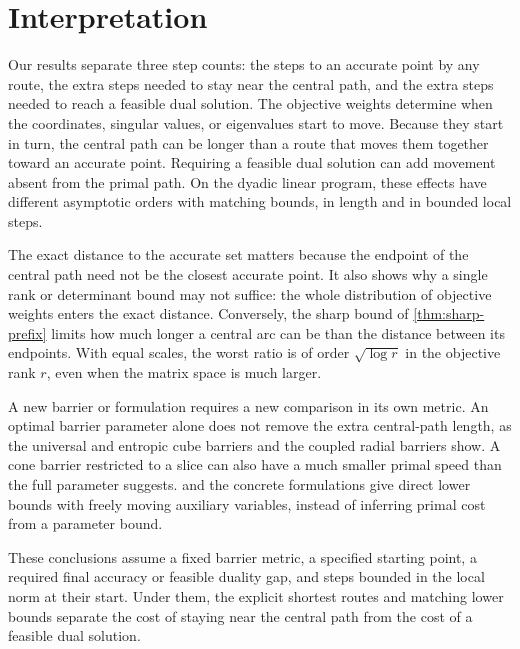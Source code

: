 \section{Interpretation}
\label{sec:interpretation}

Our results separate three step counts: the steps to an accurate point
by any route, the extra steps needed to stay near the central path,
and the extra steps needed to reach a feasible dual solution. The
objective weights determine when the coordinates, singular values, or
eigenvalues start to move. Because they start in turn, the central path
can be longer than a route that moves them together toward an accurate
point. Requiring a feasible dual solution can add movement absent from
the primal path. On the dyadic linear program, these effects have
different asymptotic orders with matching bounds, in length and in
bounded local steps.

The exact distance to the accurate set matters because the endpoint of
the central path need not be the closest accurate point. It also shows
why a single rank or determinant bound may not suffice: the whole
distribution of objective weights enters the exact distance. Conversely, the sharp bound of
\cref{thm:sharp-prefix} limits how much longer a central arc can be
than the distance between its endpoints. With equal scales,
the worst ratio is of order $\sqrt{\log r}$ in the objective rank $r$,
even when the matrix space is much larger.

A new barrier or formulation requires a new comparison in its own
metric. An optimal barrier parameter alone does not remove the extra
central-path length, as the universal and entropic cube barriers and
the coupled radial barriers show. A cone barrier restricted to a slice
can also have a much smaller primal speed than the full parameter
suggests.  and the concrete formulations give
direct lower bounds with freely moving auxiliary variables, instead of
inferring primal cost from a parameter bound.

These conclusions assume a fixed barrier metric, a specified
starting point, a required final accuracy or feasible duality gap, and
steps bounded in the local norm at their start. Under them,
the explicit shortest routes and matching lower bounds separate the
cost of staying near the central path from the cost of a feasible dual
solution.

